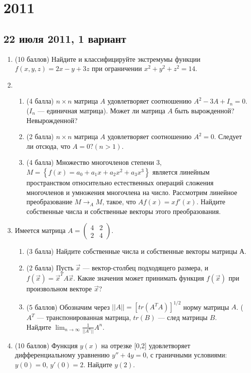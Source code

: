 \documentclass[pdftex,12pt,a4paper]{article}
\begin{document}
\section{2011}

\subsection{22 июля 2011, 1 вариант}
\begin{enumerate}
\item (10 баллов) Найдите и классифицируйте экстремумы функции $f(x,y,z)=2x-y+3z$ при ограничении $x^2+y^2+z^2=14$.\\
\item \begin{enumerate}
\item (4 балла) $n\times n$ матрица $A$ удовлетворяет соотношению $A^2-3A+I_n=0$. ($I_n$ --- единичная матрица). Может ли матрица $A$ быть вырожденной? Невырожденной?
\item (2 балла) $n\times n$ матрица $A$ удовлетворяет соотношению $A^2=0$. Следует ли отсюда, что $A=0? (n>1)$.
\item (4 балла) Множество многочленов степени 3, $M=\left\{f(x)=a_0+a_1x+a_2x^2+a_3x^3\right\}$ является линейным пространством относительно естественных операций сложения многочленов и умножения многочлена на число. Рассмотрим линейное преобразование $M\longrightarrow_A M$, такое, что $Af(x)=xf'(x)$. Найдите собственные числа и собственные векторы этого преобразования.
\end{enumerate}
\item Имеется матрица $A=\left(\begin{array}{cc}
4 & 2\\
2 & 4
\end{array}\right)$.
\begin{enumerate}
\item (3 балла) Найдите собственные числа и собственные векторы матрицы А.
\item (2 балла) Пусть $\vec{x}$ --- вектор-столбец подходящего размера, и $f(\vec{x})=\vec{x}^T A \vec{x}$. Какие значения может принимать функция $f(\vec{x})$ при произвольном векторе $\vec{x}$?
\item  (5 баллов) Обозначим через $||A||=[tr(A^TA)]^{1/2}$ норму матрицы $A$. ($A^T$ --- транспонированная матрица, $tr(B)$ --- след матрицы $B$.\\
Найдите $\lim_{n\to \infty}\frac{1}{||A^n||} A^n$.
\end{enumerate}
\item (10 баллов) Функция $y(x)$ на отрезке [0,2] удовлетворяет дифференциальному уравнению $y''+4y=0$, с граничными условиями: $y(0)=0$, $y'(0)=2$. Найдите $y(2)$.\\

\end{enumerate}
\end{document}

